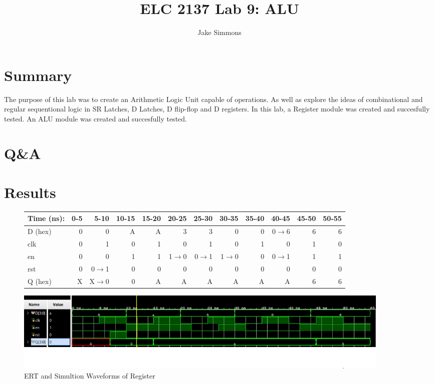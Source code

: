 \documentclass[11pt]{article}
\begin{document}
\title{ELC 2137 Lab 9: ALU}
\author{Jake Simmons}

\maketitle


\section*{Summary}

The purpose of this lab was to create an Arithmetic Logic Unit capable of operations. As well as explore the ideas of combinational and regular sequentional logic in SR Latches, D Latches, D flip-flop and D registers. In this lab, a Register module was created and succesfully tested. An ALU module was created and succesfully tested.  


\section*{Q\&A}



\section*{Results}

\begin{figure}[ht]\centering
	\begin{tabular}{l|rrrrrrrrrrr}
		Time (ns): & 0-5 & 5-10 & 10-15 & 15-20 & 20-25 & 25-30 & 30-35 & 35-40 & 40-45 & 45-50 & 50-55 \\
		\midrule
		D (hex) & 0 & 0 & A & A & 3 & 3 & 0 & 0 & 0$\rightarrow$6 & 6 & 6 \\
		clk & 0 & 1 & 0 & 1 & 0 & 1 & 0 & 1 & 0 & 1 & 0  \\
		en & 0 & 0 & 1 & 1 & 1$\rightarrow$0 & 0$\rightarrow$1 & 1$\rightarrow$0 & 0 & 0$\rightarrow$1 & 1 & 1 \\
		rst & 0 & 0$\rightarrow$1 & 0 & 0 & 0 & 0 & 0 & 0 & 0 & 0 & 0 \\
		\midrule 
		Q (hex) & X & X$\rightarrow$0 & 0 & A & A & A & A & A & A & 6 & 6 \\
		\bottomrule
	\end{tabular}\medskip
	
	\includegraphics[width=0.9\textwidth]{register_test.JPG}
	\caption{ERT and Simultion Waveforms of Register}
	\label{fig:sim_with_table}
\end{figure}
\end{document}
